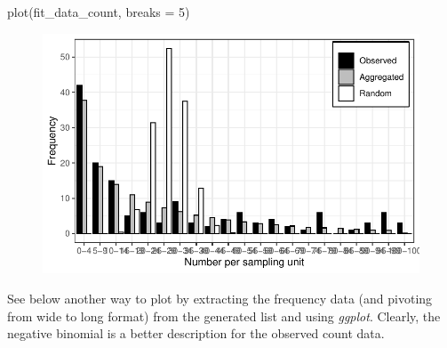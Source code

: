 \documentclass[
  letterpaper,
  DIV=11,
  numbers=noendperiod]{scrreprt}
\newenvironment{Shaded}{\begin{snugshade}}{\end{snugshade}}
\newcommand{\AttributeTok}[1]{\textcolor[rgb]{0.40,0.45,0.13}{#1}}
\newcommand{\DecValTok}[1]{\textcolor[rgb]{0.68,0.00,0.00}{#1}}
\newcommand{\FunctionTok}[1]{\textcolor[rgb]{0.28,0.35,0.67}{#1}}
\newcommand{\NormalTok}[1]{\textcolor[rgb]{0.00,0.23,0.31}{#1}}
\newcommand{\OtherTok}[1]{\textcolor[rgb]{0.00,0.23,0.31}{#1}}
\newcommand{\SpecialCharTok}[1]{\textcolor[rgb]{0.37,0.37,0.37}{#1}}
\newcommand{\StringTok}[1]{\textcolor[rgb]{0.13,0.47,0.30}{#1}}
\begin{document}
\begin{Shaded}
\begin{Highlighting}[]
\FunctionTok{plot}\NormalTok{(fit\_data\_count, }\AttributeTok{breaks =} \DecValTok{5}\NormalTok{) }
\end{Highlighting}
\end{Shaded}

\begin{figure}[H]

{\centering \includegraphics{./spatial-tests_files/figure-pdf/unnamed-chunk-92-1.pdf}

}

\end{figure}

See below another way to plot by extracting the frequency data (and
pivoting from wide to long format) from the generated list and using
\emph{ggplot}. Clearly, the negative binomial is a better description
for the observed count data.

\begin{Shaded}
\end{Shaded}
\end{document}
